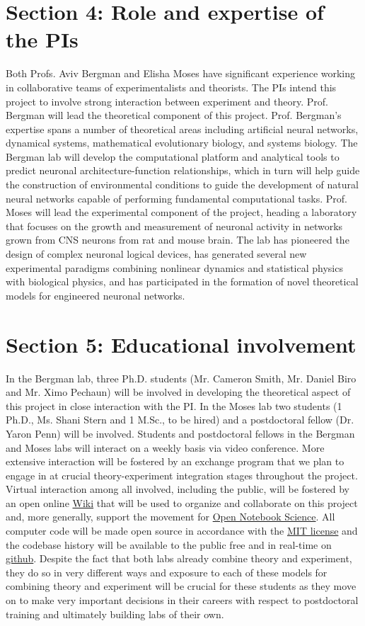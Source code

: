 \section{Section 4: Role and expertise of the PIs}
Both Profs. Aviv Bergman and Elisha Moses have significant experience working in collaborative teams of experimentalists and theorists. The PIs intend this project to involve strong interaction between experiment and theory. Prof. Bergman will lead the theoretical component of this project. Prof. Bergman's expertise spans a number of theoretical areas including artificial neural networks, dynamical systems, mathematical evolutionary biology, and systems biology. The Bergman lab will develop the computational platform and analytical tools to predict neuronal architecture-function relationships, which in turn will help guide the construction of environmental conditions to guide the development of natural neural networks capable of performing fundamental computational tasks. Prof. Moses will lead the experimental component of the project, heading a laboratory that focuses on the growth and measurement of neuronal activity in networks grown from CNS neurons from rat and mouse brain. The lab has pioneered the design of complex neuronal logical devices, has generated several new experimental paradigms combining nonlinear dynamics and statistical physics with biological physics, and has participated in the formation of novel theoretical models for engineered neuronal networks.

\section{Section 5: Educational involvement}
In the Bergman lab, three Ph.D. students (Mr. Cameron Smith, Mr. Daniel Biro and Mr. Ximo Pechaun) will be involved in developing the theoretical aspect of this project in close interaction with the PI. In the Moses lab two students (1 Ph.D., Ms. Shani Stern and 1 M.Sc., to be hired) and a postdoctoral fellow (Dr. Yaron Penn) will be involved. Students and postdoctoral fellows in the Bergman and Moses labs will interact on a weekly basis via video conference. More extensive interaction will be fostered by an exchange program that we plan to engage in at crucial theory-experiment integration stages throughout the project. Virtual interaction among all involved, including the public, will be fostered by an open online \href{http://en.wikipedia.org/wiki/Wiki}{Wiki} that will be used to organize and collaborate on this project and, more generally, support the movement for \href{http://en.wikipedia.org/wiki/Open\_notebook\_science}{Open Notebook Science}. All computer code will be made open source in accordance with the \href{http://opensource.org/licenses/MIT}{MIT license} and the codebase history will be available to the public free and in real-time on \href{http://www.github.com}{github}. Despite the fact that both labs already combine theory and experiment, they do so in very different ways and exposure to each of these models for combining theory and experiment will be crucial for these students as they move on to make very important decisions in their careers with respect to postdoctoral training and ultimately building labs of their own.